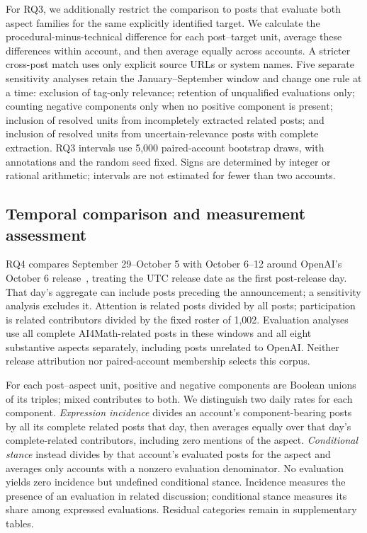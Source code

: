 \documentclass[sigconf,balance=false]{acmart}
\begin{document}
For RQ3, we additionally restrict the comparison to posts that evaluate both aspect families for the same explicitly identified target. We calculate the procedural-minus-technical difference for each post--target unit, average these differences within account, and then average equally across accounts. A stricter cross-post match uses only explicit source URLs or system names. Five separate sensitivity analyses retain the January--September window and change one rule at a time: exclusion of tag-only relevance; retention of unqualified evaluations only; counting negative components only when no positive component is present; inclusion of resolved units from incompletely extracted related posts; and inclusion of resolved units from uncertain-relevance posts with complete extraction. RQ3 intervals use 5,000 paired-account bootstrap draws, with annotations and the random seed fixed. Signs are determined by integer or rational arithmetic; intervals are not estimated for fewer than two accounts.

\subsection{Temporal comparison and measurement assessment}\label{sec:assessment}
RQ4 compares September 29--October 5 with October 6--12 around OpenAI's October 6 release~\cite{openai2026mathematicsrelease}, treating the UTC release date as the first post-release day. That day's aggregate can include posts preceding the announcement; a sensitivity analysis excludes it. Attention is related posts divided by all posts; participation is related contributors divided by the fixed roster of 1,002. Evaluation analyses use all complete AI4Math-related posts in these windows and all eight substantive aspects separately, including posts unrelated to OpenAI. Neither release attribution nor paired-account membership selects this corpus.

For each post--aspect unit, positive and negative components are Boolean unions of its triples; mixed contributes to both. We distinguish two daily rates for each component. \emph{Expression incidence} divides an account's component-bearing posts by all its complete related posts that day, then averages equally over that day's complete-related contributors, including zero mentions of the aspect. \emph{Conditional stance} instead divides by that account's evaluated posts for the aspect and averages only accounts with a nonzero evaluation denominator. No evaluation yields zero incidence but undefined conditional stance. Incidence measures the presence of an evaluation in related discussion; conditional stance measures its share among expressed evaluations. Residual categories remain in supplementary tables.
\end{document}
